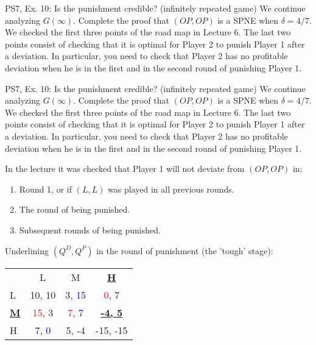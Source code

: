 \begin{frame}{PS7, Ex. 10: Is the punishment credible? (infinitely repeated game)}
    We continue analyzing $G(\infty)$. Complete the proof that $(OP,OP)$ is a SPNE when $\delta=4/7$. We checked the first three points of the road map in Lecture 6. The last two points consist of checking that it is optimal for Player 2 to punish Player 1 after a deviation. In particular, you need to check that Player 2 has no profitable deviation when he is in the first and in the second round of punishing Player 1.
    \vfill\null
\end{frame}
\begin{frame}{PS7, Ex. 10: Is the punishment credible? (infinitely repeated game)}
    We continue analyzing $G(\infty)$. Complete the proof that $(OP,OP)$ is a SPNE when $\delta=4/7$. We checked the first three points of the road map in Lecture 6. The last two points consist of checking that it is optimal for Player 2 to punish Player 1 after a deviation. In particular, you need to check that Player 2 has no profitable deviation when he is in the first and in the second round of punishing Player 1.
  \begin{multicols}{2}
    In the lecture it was checked that Player 1 will not deviate from $(OP,OP)$ in:
    \begin{enumerate}
      \item Round 1, or if $(L,L)$ was played in all previous rounds.
      \item The  round of being punished.
      \item Subsequent rounds of being punished.
    \end{enumerate}
    \vfill\null\columnbreak
    Underlining $(Q^D,Q^P)$ in the  round of punishment (the 'tough' stage):
    \vspace{-6pt}
    \begin{table}
      \begin{tabular}{l|c|c|c|}
        \multicolumn{1}{c}{} & \multicolumn{1}{c}{L} & \multicolumn{1}{c}{M} & \multicolumn{1}{c}{\textbf{\underline{H}}} \\\cline{2-4}
        L & 10, 10 & 3, \textcolor{blue}{15} & \textcolor{red}{0}, 7 \\\cline{2-4}
        \textbf{\underline{M}} & \textcolor{red}{15}, 3 & \textcolor{red}{7}, \textcolor{blue}{7} & \textbf{\underline{-4, 5}} \\\cline{2-4}
        H & 7, \textcolor{blue}{0} & 5, -4 & -15, -15 \\\cline{2-4}

\end{tabular}
\end{table}
\end{multicols}
\end{frame}
